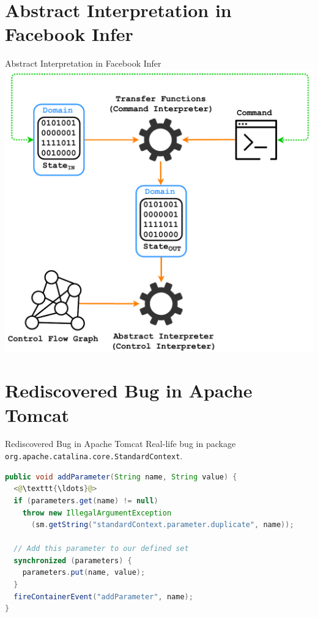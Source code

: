 \documentclass[10pt, xcolor=pdflatex, hyperref={unicode}, aspectratio=169]{beamer}
\begin{document}
\section{Abstract Interpretation in Facebook Infer}
\begin{frame}{Abstract Interpretation in Facebook Infer}
    \centering
    \includegraphics[width=.58 \linewidth]{infer-analysis.pdf}
\end{frame}


\section{Rediscovered Bug in Apache Tomcat}
\begin{frame}[fragile]{Rediscovered Bug in Apache Tomcat}
    \alert{Real-life bug} in package \texttt{org.apache.catalina.core.StandardContext}.
    
    \medskip
    
\begin{lstlisting}[language=java]
public void addParameter(String name, String value) {
  <@\texttt{\ldots}@>
  if (parameters.get(name) != null)
    throw new IllegalArgumentException
      (sm.getString("standardContext.parameter.duplicate", name));
    
  // Add this parameter to our defined set
  synchronized (parameters) {
    parameters.put(name, value);
  }
  fireContainerEvent("addParameter", name);
}
\end{lstlisting}
\end{frame}


\end{document}
